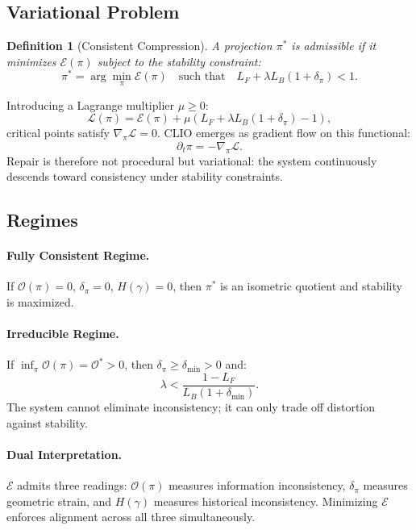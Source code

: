 \documentclass[12pt,a4paper]{article}
\newtheorem{definition}[theorem]{Definition}
\begin{document}
\subsection{Variational Problem}

\begin{definition}[Consistent Compression]
A projection $\pi^*$ is admissible if it minimizes $\mathcal{E}(\pi)$ subject to the stability constraint:
\[
\pi^* = \arg\min_{\pi} \mathcal{E}(\pi) \quad \text{such that} \quad L_F + \lambda L_B (1 + \delta_\pi) < 1.
\]
\end{definition}

Introducing a Lagrange multiplier $\mu \geq 0$:
\[
\mathcal{L}(\pi) = \mathcal{E}(\pi) + \mu \left(L_F + \lambda L_B (1 + \delta_\pi) - 1 \right),
\]
critical points satisfy $\nabla_\pi \mathcal{L} = 0$. CLIO emerges as gradient flow on this functional:
\[
\partial_t \pi = -\nabla_\pi \mathcal{L}.
\]
Repair is therefore not procedural but variational: the system continuously descends toward consistency under stability constraints.

\subsection{Regimes}

\paragraph{Fully Consistent Regime.}
If $\mathcal{O}(\pi)=0$, $\delta_\pi=0$, $H(\gamma)=0$, then $\pi^*$ is an isometric quotient and stability is maximized.

\paragraph{Irreducible Regime.}
If $\inf_\pi \mathcal{O}(\pi) = \mathcal{O}^* > 0$, then $\delta_\pi \geq \delta_{\min} > 0$ and:
\[
\lambda < \frac{1 - L_F}{L_B (1 + \delta_{\min})}.
\]
The system cannot eliminate inconsistency; it can only trade off distortion against stability.

\paragraph{Dual Interpretation.}
$\mathcal{E}$ admits three readings: $\mathcal{O}(\pi)$ measures information inconsistency, $\delta_\pi$ measures geometric strain, and $H(\gamma)$ measures historical inconsistency. Minimizing $\mathcal{E}$ enforces alignment across all three simultaneously.
\end{document}
